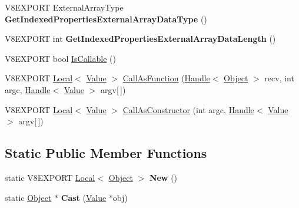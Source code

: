\begin{DoxyCompactItemize}
\item 
\hypertarget{classv8_1_1_object_a235b6394b7651077dc2a7642bc97c4a9}{}V8\+E\+X\+P\+O\+R\+T External\+Array\+Type {\bfseries Get\+Indexed\+Properties\+External\+Array\+Data\+Type} ()\label{classv8_1_1_object_a235b6394b7651077dc2a7642bc97c4a9}

\item 
\hypertarget{classv8_1_1_object_aa0b083e6d5ec0a17d300759de482a1d2}{}V8\+E\+X\+P\+O\+R\+T int {\bfseries Get\+Indexed\+Properties\+External\+Array\+Data\+Length} ()\label{classv8_1_1_object_aa0b083e6d5ec0a17d300759de482a1d2}

\item 
V8\+E\+X\+P\+O\+R\+T bool \hyperlink{classv8_1_1_object_a73e7f8c470da4fa3ccc2ce8d58671bed}{Is\+Callable} ()
\item 
V8\+E\+X\+P\+O\+R\+T \hyperlink{classv8_1_1_local}{Local}$<$ \hyperlink{classv8_1_1_value}{Value} $>$ \hyperlink{classv8_1_1_object_ab6b6c44668d7a0d0b5b1056f8de4fd6b}{Call\+As\+Function} (\hyperlink{classv8_1_1_handle}{Handle}$<$ \hyperlink{classv8_1_1_object}{Object} $>$ recv, int argc, \hyperlink{classv8_1_1_handle}{Handle}$<$ \hyperlink{classv8_1_1_value}{Value} $>$ argv\mbox{[}$\,$\mbox{]})
\item 
V8\+E\+X\+P\+O\+R\+T \hyperlink{classv8_1_1_local}{Local}$<$ \hyperlink{classv8_1_1_value}{Value} $>$ \hyperlink{classv8_1_1_object_a156c6b33082be397626ce106369e4eba}{Call\+As\+Constructor} (int argc, \hyperlink{classv8_1_1_handle}{Handle}$<$ \hyperlink{classv8_1_1_value}{Value} $>$ argv\mbox{[}$\,$\mbox{]})
\end{DoxyCompactItemize}
\subsection*{Static Public Member Functions}
\begin{DoxyCompactItemize}
\item 
\hypertarget{classv8_1_1_object_a45c986af65c199e7f453719d03de7650}{}static V8\+E\+X\+P\+O\+R\+T \hyperlink{classv8_1_1_local}{Local}$<$ \hyperlink{classv8_1_1_object}{Object} $>$ {\bfseries New} ()\label{classv8_1_1_object_a45c986af65c199e7f453719d03de7650}

\item 
\hypertarget{classv8_1_1_object_a1f9ac46d0b164197318ce81dc0ec1343}{}static \hyperlink{classv8_1_1_object}{Object} $\ast$ {\bfseries Cast} (\hyperlink{classv8_1_1_value}{Value} $\ast$obj)\label{classv8_1_1_object_a1f9ac46d0b164197318ce81dc0ec1343}

\end{DoxyCompactItemize}


